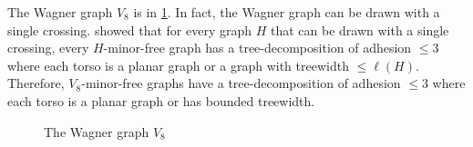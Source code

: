 

The Wagner graph $V_8$ is in \cref{fig:wagner}. In fact, the Wagner graph can be drawn with a single crossing. \textcite{robertsonExcludingGraphOne1993} showed that for every graph $H$ that can be drawn with a single crossing, every $H$-minor-free graph has a tree-decomposition of adhesion $\leq 3$ where each torso is a planar graph or a graph with treewidth $\leq \ell(H)$. Therefore, $V_8$-minor-free graphs have a tree-decomposition of adhesion $\leq 3$ where each torso is a planar graph or has bounded treewidth. 
\begin{figure}[h!]
	\centering
	\begin{tikzpicture}[thick,scale=1.5, every node/.style={scale=2}]
		
	\end{tikzpicture}
	\caption[Wagner graph]{The Wagner graph $V_8$}\label{fig:wagner}
\end{figure}